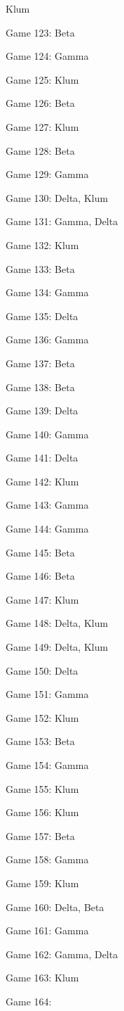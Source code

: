 \documentclass{article}
\begin{document}
\begin{multicols}{3}
\begin{compactitem}
Klum
\item Game 123:
Beta
\item Game 124:
Gamma
\item Game 125:
Klum
\item Game 126:
Beta
\item Game 127:
Klum
\item Game 128:
Beta
\item Game 129:
Gamma
\item Game 130:
Delta, Klum
\item Game 131:
Gamma, Delta
\item Game 132:
Klum
\item Game 133:
Beta
\item Game 134:
Gamma
\item Game 135:
Delta
\item Game 136:
Gamma
\item Game 137:
Beta
\item Game 138:
Beta
\item Game 139:
Delta
\item Game 140:
Gamma
\item Game 141:
Delta
\item Game 142:
Klum
\item Game 143:
Gamma
\item Game 144:
Gamma
\item Game 145:
Beta
\item Game 146:
Beta
\item Game 147:
Klum
\item Game 148:
Delta, Klum
\item Game 149:
Delta, Klum
\item Game 150:
Delta
\item Game 151:
Gamma
\item Game 152:
Klum
\item Game 153:
Beta
\item Game 154:
Gamma
\item Game 155:
Klum
\item Game 156:
Klum
\item Game 157:
Beta
\item Game 158:
Gamma
\item Game 159:
Klum
\item Game 160:
Delta, Beta
\item Game 161:
Gamma
\item Game 162:
Gamma, Delta
\item Game 163:
Klum
\item Game 164:

\end{compactitem}
\end{multicols}
\end{document}
